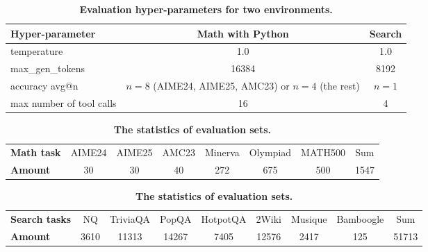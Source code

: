 \begin{table}[t]
    \caption{\textbf{Evaluation hyper-parameters for two environments.}}
    \label{tab:eval_hyperparams}
    \footnotesize
    \centering
    \begin{tabular}{lcc}
        \toprule
        \textbf{Hyper-parameter} & \textbf{Math with Python} & \textbf{Search} \\
        \midrule
        temperature & 1.0 & 1.0 \\
        max\_gen\_tokens & 16384 & 8192 \\
        accuracy avg@n & $n=8$ (AIME24, AIME25, AMC23) or $n=4$ (the rest) & $n=1$ \\
        max number of tool calls  & 16 & 4 \\
        \bottomrule
    \end{tabular}
\end{table}

\begin{table}[t]
    \caption{\textbf{The statistics of evaluation sets.}}
    \label{tab:eval_statistics}
    \centering
    \small
    \begin{tabular}{l|ccccccc}
        \toprule
        \textbf{Math task} & AIME24 & AIME25 & AMC23 & Minerva & Olympiad & MATH500 & Sum \\
        \textbf{Amount} & 30 & 30 & 40 & 272 & 675 & 500 & 1547 \\
    \end{tabular}
    \vspace{1mm}
    \begin{tabular}{l|cccccccc}
        \toprule
        \textbf{Search tasks} & NQ & TriviaQA & PopQA & HotpotQA & 2Wiki & Musique & Bamboogle & Sum \\
        \textbf{Amount} & 3610 & 11313 & 14267 & 7405 & 12576 & 2417 & 125 & 51713 \\
        \bottomrule
    \end{tabular}
\end{table}

